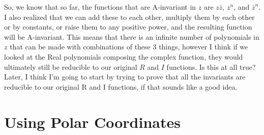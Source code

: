 \documentclass{amsart}
\begin{document}
So, we know that so far, the functions that are A-invariant in $z$ are $z\bar{z}$, $z^n$, and $\bar{z}^n$. I also realized that we can add these to each other, multiply them by each other or by constants, or raise them to any positive power, and the resulting function will be A-invariant. This means that there is an infinite number of polynomials in $z$ that can be made with combinations of these 3 things, however I think if we looked at the Real polynomials composing the complex function, they would ultimately still be reducible to our original $R$ and $I$ functions. Is this at all true? Later, I think I'm going to start by trying to prove that all the invariants are reducible to our original R and I functions, if that sounds like a good idea. 

\section*{Using Polar Coordinates}
\end{document}

